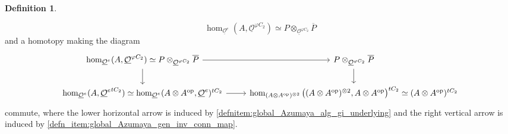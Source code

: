 \documentclass{article}
\newcommand{\op}{\mathrm{op}} %
\theoremstyle{definition}
\newtheorem{definition}[equation]{Definition}
\begin{document}
\begin{definition}
\begin{enumerate}[label=(\alph*)]
        \begin{equation*}
            \hom_{\underline{\mathcal{O}}^e}(A, \underline{\mathcal{O}}^{\varphi C_2}) \simeq P \otimes_{\underline{\mathcal{O}}^{\varphi C_2}} \overline{P}
        \end{equation*}
        and a homotopy making the diagram 
        \begin{equation*}
        \begin{tikzcd}
            \hom_{\underline{\mathcal{O}}^e}(A, \underline{\mathcal{O}}^{\varphi C_2}) \simeq P \otimes_{\underline{\mathcal{O}}^{\varphi C_2}} \overline{P} \ar[r] \ar[d] & P \otimes_{\underline{\mathcal{O}}^{\varphi C_2}} \overline{P} \ar[d] \\
            \hom_{\underline{\mathcal{O}}^e}(A, {\underline{\mathcal{O}}^e}^{tC_2}) \simeq \hom_{\underline{\mathcal{O}}^e}(A \otimes A^\op, \underline{\mathcal{O}}^e)^{tC_2} \ar[r] & \hom_{(A \otimes A^\op)^{\otimes 2}}\left((A \otimes A^\op)^{\otimes 2}, A \otimes A^\op\right)^{tC_2} \simeq (A \otimes A^\op)^{tC_2}
        \end{tikzcd}    
        \end{equation*}
        commute, where the lower horizontal arrow is induced by \ref{defnitem:global_Azumaya_alg_gi_underlying} and the right vertical arrow is induced by \ref{defn_item:global_Azumaya_gen_inv_conn_map}. 
    \end{enumerate}
\end{definition}
\end{document}

